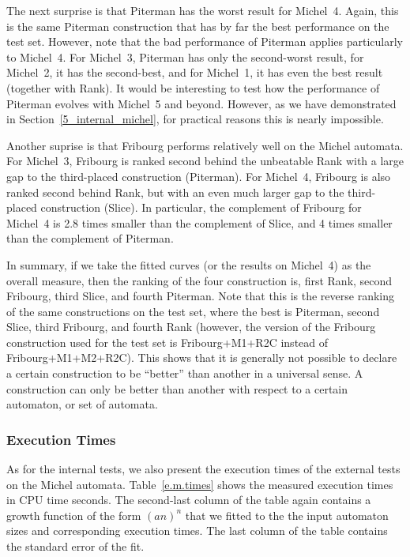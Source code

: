The next surprise is that Piterman has the worst result for Michel~4. Again, this is the same Piterman construction that has by far the best performance on the \goal{} test set. However, note that the bad performance of Piterman applies particularly to Michel~4. For Michel~3, Piterman has only the second-worst result, for Michel~2, it has the second-best, and for Michel~1, it has even the best result (together with Rank). It would be interesting to test how the performance of Piterman evolves with Michel~5 and beyond. However, as we have demonstrated in Section~\ref{5_internal_michel}, for practical reasons this is nearly impossible.

Another suprise is that Fribourg performs relatively well on the Michel automata. For Michel~3, Fribourg is ranked second behind the unbeatable Rank with a large gap to the third-placed construction (Piterman). For Michel~4, Fribourg is also ranked second behind Rank, but with an even much larger gap to the third-placed construction (Slice). In particular, the complement of Fribourg for Michel~4 is 2.8 times smaller than the complement of Slice, and 4 times smaller than the complement of Piterman.

In summary, if we take the fitted curves (or the results on Michel~4) as the overall measure, then the ranking of the four construction is, first Rank, second Fribourg, third Slice, and fourth Piterman. Note that this is the reverse ranking of the same constructions on the \goal{} test set, where the best is Piterman, second Slice, third Fribourg, and fourth Rank (however, the version of the Fribourg construction used for the \goal{} test set is Fribourg+M1+R2C instead of Fribourg+M1+M2+R2C). This shows that it is generally not possible to declare a certain construction to be ``better'' than another in a universal sense. A construction can only be better than another with respect to a certain automaton, or set of automata.

\subsubsection{Execution Times}
As for the internal tests, we also present the execution times of the external tests on the Michel automata. Table~\ref{e.m.times} shows the measured execution times in CPU time seconds. The second-last column of the table again contains a growth function of the form $(an)^n$ that we fitted to the the input automaton sizes and corresponding execution times. The last column of the table contains the standard error of the fit.

